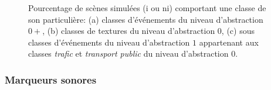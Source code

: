 \documentclass[twoside,twocolumn]{article}
\begin{document}
\begin{figure}[t]
        \myfloatalign
         \par    
       \caption{Pourcentage de scènes simulées (i ou ni) comportant une classe de son particulière: (a) classes d'événements du niveau d'abstraction $0+$, (b) classes de textures du niveau d'abstraction $0$, (c) sous classes d'événements du niveau d'abstraction $1$ appartenant aux classes \emph{trafic} et \emph{transport public} du niveau d'abstraction $0$.}\label{fig:soundsource}
\end{figure}

\subsubsection*{Marqueurs sonores}
\end{document}
